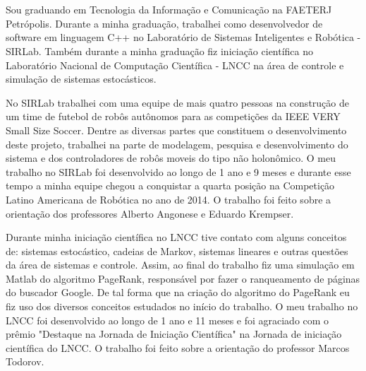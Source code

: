 \documentclass[a4paper]{report} %
\begin{document}
\section*{}
\vspace{-1.3cm}
\subsection*{}

\vspace{1cm}

Sou graduando em Tecnologia da Informação e Comunicação na FAETERJ Petrópolis. Durante a minha graduação, trabalhei como desenvolvedor de software em linguagem C++ no Laboratório de Sistemas Inteligentes e Robótica - SIRLab. Também durante a minha graduação fiz iniciação científica no Laboratório Nacional de Computação Científica - LNCC na área de controle e simulação de sistemas estocásticos. 

No SIRLab trabalhei com uma equipe de mais quatro pessoas na construção de um time de futebol de robôs autônomos para as competições da IEEE VERY Small Size Soccer. Dentre as diversas partes que constituem o desenvolvimento deste projeto, trabalhei na parte de modelagem, pesquisa e desenvolvimento do sistema e dos controladores de robôs moveis do tipo não holonômico. O meu trabalho no SIRLab foi desenvolvido ao longo de 1 ano e 9 meses e durante esse tempo a minha equipe chegou a conquistar a quarta posição na Competição Latino Americana de Robótica no ano de 2014. O trabalho foi feito sobre a orientação dos professores Alberto Angonese e Eduardo Krempser.

Durante minha iniciação científica no LNCC tive contato com alguns conceitos de: sistemas estocástico, cadeias de Markov, sistemas lineares e outras questões da área de sistemas e controle. Assim, ao final do trabalho fiz uma simulação em Matlab do algoritmo PageRank, responsável por fazer o ranqueamento de páginas do buscador Google. De tal forma que na criação do algoritmo do PageRank eu fiz uso dos diversos conceitos estudados no início do trabalho. O meu trabalho no LNCC foi desenvolvido ao longo de 1 ano e 11 meses e foi agraciado com o prêmio "Destaque na Jornada de Iniciação Científica" na Jornada de iniciação científica do LNCC. O trabalho foi feito sobre a orientação do professor Marcos Todorov.

\end{document}
